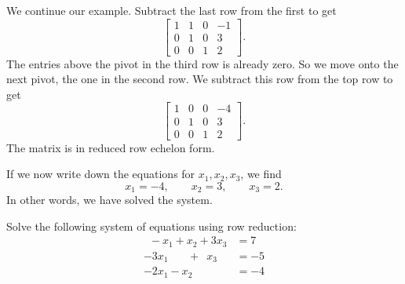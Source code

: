 We continue our example.
Subtract the last row from the first to get
\begin{equation*}
\left[
\begin{array}{ccc|c}
1 & 1 & 0 & -1 \\
0 & 1 & 0 & 3 \\
0 & 0 & 1 & 2 
\end{array}
\right] .
\end{equation*}
The entries above the pivot in the third row is already zero.
So we move onto the next pivot, the one in the second row.  We subtract
this row from the top row to get
\begin{equation*}
\left[
\begin{array}{ccc|c}
1 & 0 & 0 & -4 \\
0 & 1 & 0 & 3 \\
0 & 0 & 1 & 2 
\end{array}
\right] .
\end{equation*}
The matrix is in reduced row echelon form.

If we now write down the equations for $x_1,x_2,x_3$, we find
\begin{equation*}
x_1 = -4, \qquad x_2 = 3, \qquad x_3 = 2 .
\end{equation*}
In other words, we have solved the system.

\begin{example}
Solve the following system of equations using row reduction:
\begin{equation*}
\begin{split}
\phantom{9} -x_1 + x_2 + 3x_3 &= 7 \\
-3x_1 \phantom{+x_2} + \phantom{9} x_3 &= -5 \\
-2x_1 - x_2 &= -4
\end{split}
\end{equation*}
\end{example}

